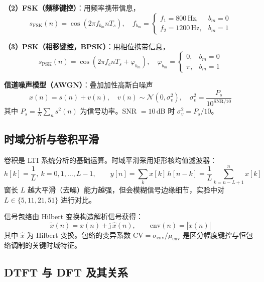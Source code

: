\documentclass[12pt, a4paper, UTF8]{ctexart}
\begin{document}
\textbf{（2）FSK（频移键控）}：用频率携带信息，
\begin{equation}
s_{\mathrm{FSK}}(n) = \cos\!\left(2\pi f_{b_m} n T_s\right), \quad f_{b_m}=\begin{cases}f_1=800\,\mathrm{Hz}, & b_m=0\\ f_2=1200\,\mathrm{Hz}, & b_m=1\end{cases}
\end{equation}

\textbf{（3）PSK（相移键控，BPSK）}：用相位携带信息，
\begin{equation}
s_{\mathrm{PSK}}(n) = \cos\!\left(2\pi f_c n T_s + \varphi_{b_m}\right), \quad \varphi_{b_m}=\begin{cases}0, & b_m=0\\ \pi, & b_m=1\end{cases}
\end{equation}

\textbf{信道噪声模型（AWGN）}：叠加加性高斯白噪声
\begin{equation}
x(n) = s(n) + v(n), \quad v(n)\sim\mathcal{N}(0,\sigma_v^2), \quad \sigma_v^2 = \frac{P_s}{10^{\mathrm{SNR}/10}}
\end{equation}
其中 $P_s=\frac{1}{N}\sum_n s^2(n)$ 为信号功率。SNR $=10$\,dB 时 $\sigma_v^2 = P_s/10$。

\subsection{时域分析与卷积平滑}

卷积是 LTI 系统分析的基础运算。时域平滑采用矩形核均值滤波器：
\begin{equation}
h[k] = \frac{1}{L},\ k=0,1,\dots,L-1, \qquad y[n] = \sum_{k} x[k]\,h[n-k] = \frac{1}{L}\sum_{k=n-L+1}^{n} x[k]
\end{equation}
窗长 $L$ 越大平滑（去噪）能力越强，但会模糊信号边缘细节，实验中对 $L\in\{5,11,21,51\}$ 进行对比。

信号包络由 Hilbert 变换构造解析信号获得：
\begin{equation}
\tilde{x}(n) = x(n) + \mathrm{j}\,\hat{x}(n), \qquad \mathrm{env}(n) = |\tilde{x}(n)|
\end{equation}
其中 $\hat{x}$ 为 Hilbert 变换。包络的变异系数 $\mathrm{CV}=\sigma_{\mathrm{env}}/\mu_{\mathrm{env}}$ 是区分幅度键控与恒包络调制的关键时域特征。

\subsection{DTFT 与 DFT 及其关系}
\end{document}

